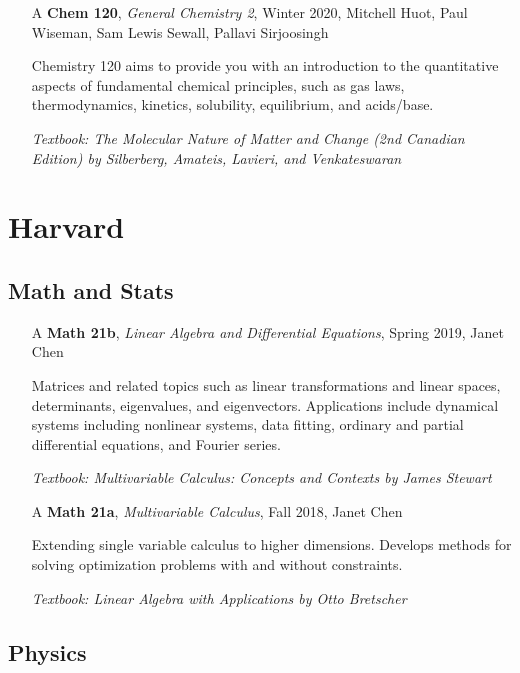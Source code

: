 \documentclass{scrartcl}
\begin{document}
\begin{itemize}
\item[A] \textbf{Chem 120}, \textit{General Chemistry 2}, Winter 2020, Mitchell
  Huot, Paul Wiseman, Sam Lewis Sewall, Pallavi Sirjoosingh
  
  Chemistry 120 aims to provide you with an introduction to the quantitative aspects of fundamental chemical principles, such as gas laws, thermodynamics, kinetics, solubility, equilibrium, and acids/base.
  
  \textit{\small Textbook: The Molecular Nature of Matter and Change (2nd
    Canadian Edition) by Silberberg, Amateis, Lavieri, and Venkateswaran}
\end{itemize}


\section*{Harvard}

\subsection*{Math and Stats}

\begin{itemize}
  \item[A] \textbf{Math 21b}, \textit{Linear Algebra and Differential Equations}, Spring 2019, Janet Chen 
  
  Matrices and related topics such as linear transformations and linear spaces, determinants, eigenvalues, and eigenvectors. Applications include dynamical systems including nonlinear systems, data fitting, ordinary and partial differential equations, and Fourier series.
  
  \textit{\small Textbook: Multivariable Calculus: Concepts and Contexts by James Stewart}
  
  \item[A] \textbf{Math 21a}, \textit{Multivariable Calculus}, Fall 2018, Janet Chen 
  
  Extending single variable calculus to higher dimensions. Develops methods for solving optimization problems with and without constraints.
  
  \textit{\small Textbook: Linear Algebra with Applications by Otto Bretscher}
  
\end{itemize} 

\subsection*{Physics}
\end{document}
